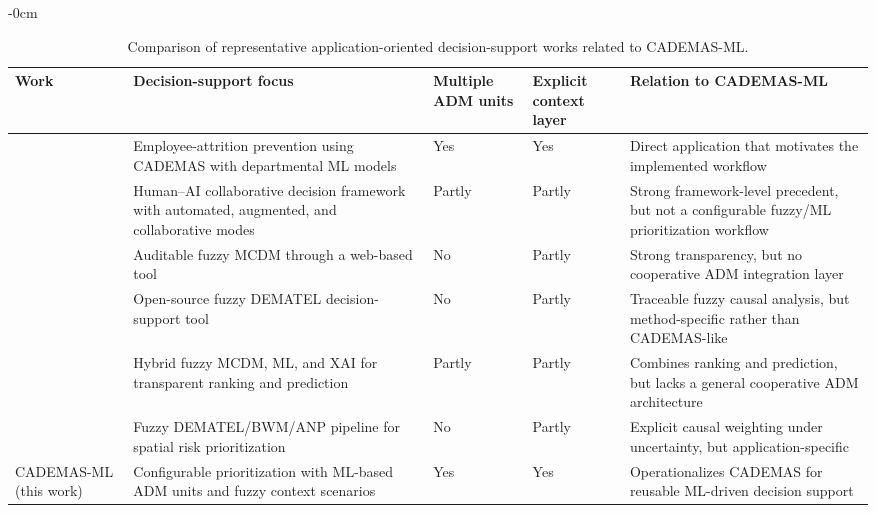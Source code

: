 \documentclass[]{article}
\newlength{\extralength}
\begin{document}

\begin{table}[t]
\caption{Comparison of representative application-oriented decision-support works related to CADEMAS-ML.\label{tab:related}}
\small
\begin{adjustwidth}{-\extralength}{0cm}
    \begin{tabular}{p{2cm} p{2cm} p{2cm} p{2cm} p{2cm}}
		\toprule
		\textbf{Work} & \textbf{Decision-support focus} & \textbf{Multiple ADM units} & \textbf{Explicit context layer} & \textbf{Relation to CADEMAS-ML} \\
		\midrule
		\citet{Godz2026} & Employee-attrition prevention using CADEMAS with departmental ML models & Yes & Yes & Direct application that motivates the implemented workflow \\
		\citet{Tariq2024a} & Human--AI collaborative decision framework with automated, augmented, and collaborative modes & Partly & Partly & Strong framework-level precedent, but not a configurable fuzzy/ML prioritization workflow \\
		\citet{Wieckowski2024} & Auditable fuzzy MCDM through a web-based tool & No & Partly & Strong transparency, but no cooperative ADM integration layer \\
		\citet{Chekry2024} & Open-source fuzzy DEMATEL decision-support tool & No & Partly & Traceable fuzzy causal analysis, but method-specific rather than CADEMAS-like \\
		\citet{Ozkurt2025} & Hybrid fuzzy MCDM, ML, and XAI for transparent ranking and prediction & Partly & Partly & Combines ranking and prediction, but lacks a general cooperative ADM architecture \\
		\citet{Sahraei2022} & Fuzzy DEMATEL/BWM/ANP pipeline for spatial risk prioritization & No & Partly & Explicit causal weighting under uncertainty, but application-specific \\
		\midrule
		CADEMAS-ML (this work) & Configurable prioritization with ML-based ADM units and fuzzy context scenarios & Yes & Yes & Operationalizes CADEMAS for reusable ML-driven decision support \\
		\bottomrule
	\end{tabular}
\end{adjustwidth}
\end{table}
\end{document}
